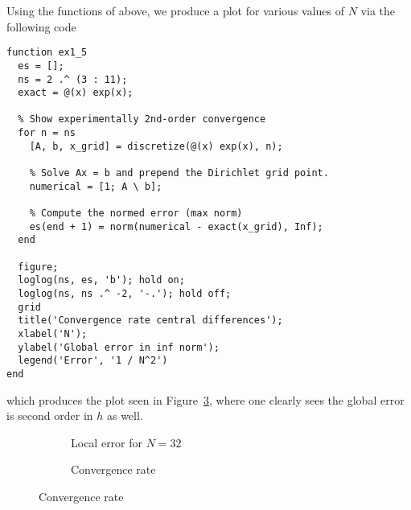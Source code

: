 \documentclass[a4paper]{article}
\begin{document}
  Using the functions of above, we produce a plot for various values of $N$ via the following code
  \begin{lstlisting}
function ex1_5
  es = [];
  ns = 2 .^ (3 : 11);
  exact = @(x) exp(x);

  % Show experimentally 2nd-order convergence
  for n = ns
    [A, b, x_grid] = discretize(@(x) exp(x), n);

    % Solve Ax = b and prepend the Dirichlet grid point.
    numerical = [1; A \ b];

    % Compute the normed error (max norm)
    es(end + 1) = norm(numerical - exact(x_grid), Inf);
  end

  figure;
  loglog(ns, es, 'b'); hold on;
  loglog(ns, ns .^ -2, '-.'); hold off;
  grid
  title('Convergence rate central differences');
  xlabel('N');
  ylabel('Global error in inf norm');
  legend('Error', '1 / N^2')
end
  \end{lstlisting}
  which produces the plot seen in Figure~\ref{fig:ex5}, where one clearly sees the global error is second order in $h$ as well.

  \begin{figure}[b]
    \centering
    \begin{subfigure}[c]{0.47\textwidth}
      \caption{Local error for $N = 32$}
      
      \label{fig:ex4}
    \end{subfigure}
    \begin{subfigure}[c]{0.47\textwidth}
      \caption{Convergence rate}
      
      \label{fig:ex5}
    \end{subfigure}
  \end{figure}
\end{document}
